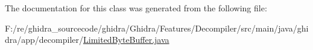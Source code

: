 The documentation for this class was generated from the following file\+:\begin{DoxyCompactItemize}
\item 
F\+:/re/ghidra\+\_\+sourcecode/ghidra/\+Ghidra/\+Features/\+Decompiler/src/main/java/ghidra/app/decompiler/\mbox{\hyperlink{_limited_byte_buffer_8java}{Limited\+Byte\+Buffer.\+java}}\end{DoxyCompactItemize}
